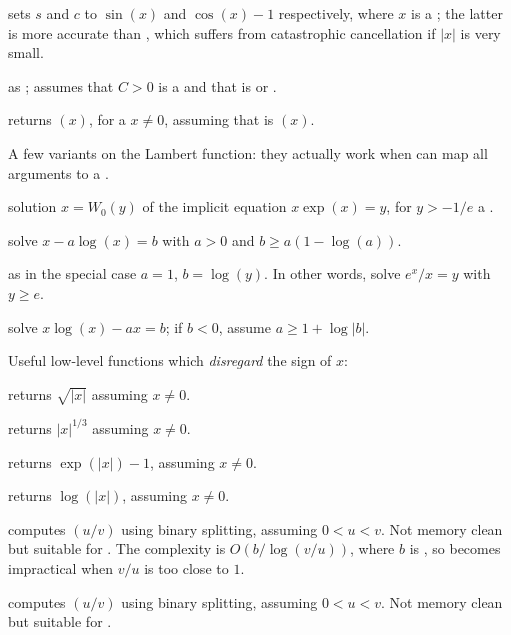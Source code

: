  sets $s$ and $c$ to
$\sin(x)$ and $\cos(x)-1$ respectively, where $x$ is a ; the latter
is more accurate than , which suffers from
catastrophic cancellation if $|x|$ is very small.

 as ; assumes
that $C > 0$ is a  and that  is  or .

 returns $(x)$, for a 
$x\neq 0$, assuming that  is $(x)$.

\noindent A few variants on the Lambert function: they actually work when
 can map all  arguments to a .

 solution $x = W_0(y)$ of the implicit equation
$x \exp(x) = y$, for $y > -1/e$ a .

solve $x - a  \log(x) = b$ with $a > 0$ and $b \geq a (1 - \log(a))$.

 as 
in the special case $a = 1$, $b = \log(y)$. In other words,
solve $e^x / x = y$ with $y \geq e$.

solve $x  \log(x) - a  x = b$; if $b < 0$, assume $a \geq 1 + \log |b|$.

\noindent Useful low-level functions which \emph{disregard} the sign of $x$:

 returns $\sqrt{|x|}$ assuming $x\neq 0$.

 returns $|x|^{1/3}$ assuming $x\neq 0$.

 returns $\exp(|x|) - 1$, assuming $x \neq 0$.

 returns $\log(|x|)$, assuming $x \neq 0$.


 computes $(u/v)$
using binary splitting, assuming $0 < u < v$. Not memory clean but suitable
for . The complexity is $O(b / \log(v/u))$, where $b$ is
, so becomes impractical when $v/u$ is too close to
$1$.

 computes $(u/v)$
using binary splitting, assuming $0 < u < v$. Not memory clean but suitable
for .


